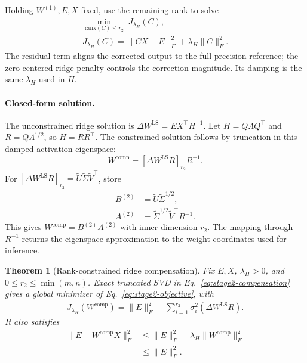 \documentclass[11pt]{article}
\newtheorem{theorem}{Theorem}
\begin{document}
Holding $W^{(1)},E,X$ fixed, use the remaining rank to solve
\begin{equation}
\begin{aligned}
\min_{\mathrm{rank}(C)\le r_2}\;J_{\lambda_H}(C),\\
J_{\lambda_H}(C)=\|CX-E\|_F^2+\lambda_H\|C\|_F^2.
\end{aligned}
\label{eq:stage2-objective}
\end{equation}
The residual term aligns the corrected output to the full-precision reference; the zero-centered ridge penalty controls the correction magnitude. Its damping is the same $\lambda_H$ used in $H$.

\paragraph{Closed-form solution.}
The unconstrained ridge solution is $\Delta W^{\mathrm{LS}}=EX^\top H^{-1}$. Let $H=Q\Lambda Q^\top$ and $R=Q\Lambda^{1/2}$, so $H=RR^\top$. The constrained solution follows by truncation in this damped activation eigenspace:
\begin{equation}
W^{\mathrm{comp}}=[\Delta W^{\mathrm{LS}}R]_{r_2}R^{-1}.
\label{eq:stage2-compensation}
\end{equation}
For $[\Delta W^{\mathrm{LS}}R]_{r_2}=\tilde U\tilde\Sigma\tilde V^\top$, store
\begin{equation}
\begin{aligned}
B^{(2)}&=\tilde U\tilde\Sigma^{1/2},\\
A^{(2)}&=\tilde\Sigma^{1/2}\tilde V^\top R^{-1}.
\end{aligned}
\label{eq:stage2-factors}
\end{equation}
This gives $W^{\mathrm{comp}}=B^{(2)}A^{(2)}$ with inner dimension $r_2$. The mapping through $R^{-1}$ returns the eigenspace approximation to the weight coordinates used for inference.

\begin{theorem}[Rank-constrained ridge compensation]\label{thm:ridge-compensation}
Fix $E,X$, $\lambda_H>0$, and $0\le r_2\le\min(m,n)$. Exact truncated SVD in Eq.~\eqref{eq:stage2-compensation} gives a global minimizer of Eq.~\eqref{eq:stage2-objective}, with
\begin{equation}
\begin{aligned}
J_{\lambda_H}(W^{\mathrm{comp}})
=\|E\|_F^2-\sum_{i=1}^{r_2}
\sigma_i^2(\Delta W^{\mathrm{LS}}R).
\end{aligned}
\label{eq:ridge-optimum}
\end{equation}
It also satisfies
\begin{equation}
\begin{aligned}
\|E-W^{\mathrm{comp}}X\|_F^2
&\le\|E\|_F^2-\lambda_H\|W^{\mathrm{comp}}\|_F^2\\
&\le\|E\|_F^2.
\end{aligned}
\label{eq:lemma-residual}
\end{equation}
\end{theorem}
\end{document}
